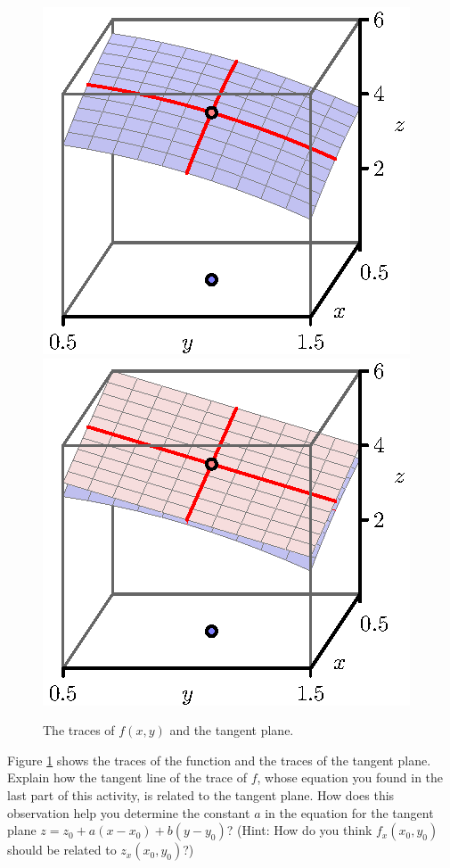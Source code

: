 \begin{pa}
  \begin{figure}[ht]
    \begin{center}
      \includegraphics{figures/fig_10_4_tangent_5.eps}
      \hspace*{20pt}
      \includegraphics{figures/fig_10_4_tangent_6.eps}
    \end{center}
    \caption{The traces of $f(x,y)$ and the tangent plane.}
    \label{F:10.4.tangent.traces}
  \end{figure}
  
\item Figure \ref{F:10.4.tangent.traces} shows the traces of the
  function and the traces of the tangent plane.  Explain how the
  tangent line of the trace of $f$, whose equation you found in the
  last part of this 
  activity, is related to the tangent plane.  How does this
  observation help you determine the constant $a$ in the equation for the tangent plane $z
  = z_0+a(x-x_0) + b(y-y_0)$?  (Hint: How do you think $f_x(x_0,y_0)$ should be related to $z_x(x_0,y_0)$?)




\end{pa}
